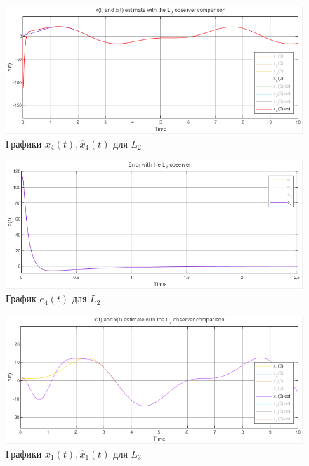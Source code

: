\documentclass[a4paper, 12pt]{article}
\begin{document}
    \newpage
    \vspace*{5mm}
    \begin{figure}[H]
        \centering
        \includegraphics[scale=0.7]{2task_x4comp_L2.png}
        \captionsetup{skip=0pt}
        \caption{Графики $x_4(t),\hat{x}_4(t)$ для $L_2$}
        \label{fig:2task_x4comp_L2}
    \end{figure}
    \begin{figure}[H]
        \centering
        \includegraphics[scale=0.7]{2task_e4_L2.png}
        \captionsetup{skip=0pt}
        \caption{График $e_4(t)$ для $L_2$}
        \label{fig:2task_e4_L2}
    \end{figure}
    \begin{figure}[H]
        \centering
        \includegraphics[scale=0.7]{2task_x1comp_L3.png}
        \captionsetup{skip=0pt}
        \caption{Графики $x_1(t),\hat{x}_1(t)$ для $L_3$}
        \label{fig:2task_x1comp_L3}
    \end{figure}
\end{document}
